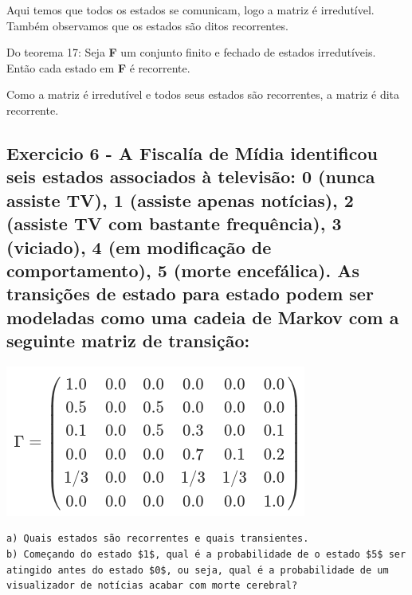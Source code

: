 \documentclass[
]{article}
\begin{document}
Aqui temos que todos os estados se comunicam, logo a matriz é
irredutível. Também observamos que os estados são ditos recorrentes.

Do teorema 17: Seja \textbf{F} um conjunto finito e fechado de estados
irredutíveis. Então cada estado em \textbf{F} é recorrente.

Como a matriz é irredutível e todos seus estados são recorrentes, a
matriz é dita recorrente.

\pagebreak

\hypertarget{exercicio-6---a-fiscaluxeda-de-muxeddia-identificou-seis-estados-associados-uxe0-televisuxe3o-0-nunca-assiste-tv-1-assiste-apenas-notuxedcias-2-assiste-tv-com-bastante-frequuxeancia-3-viciado-4-em-modificauxe7uxe3o-de-comportamento-5-morte-encefuxe1lica.-as-transiuxe7uxf5es-de-estado-para-estado-podem-ser-modeladas-como-uma-cadeia-de-markov-com-a-seguinte-matriz-de-transiuxe7uxe3o}{%
\subsection{Exercicio 6 - A Fiscalía de Mídia identificou seis estados
associados à televisão: 0 (nunca assiste TV), 1 (assiste apenas
notícias), 2 (assiste TV com bastante frequência), 3 (viciado), 4 (em
modificação de comportamento), 5 (morte encefálica). As transições de
estado para estado podem ser modeladas como uma cadeia de Markov com a
seguinte matriz de
transição:}\label{exercicio-6---a-fiscaluxeda-de-muxeddia-identificou-seis-estados-associados-uxe0-televisuxe3o-0-nunca-assiste-tv-1-assiste-apenas-notuxedcias-2-assiste-tv-com-bastante-frequuxeancia-3-viciado-4-em-modificauxe7uxe3o-de-comportamento-5-morte-encefuxe1lica.-as-transiuxe7uxf5es-de-estado-para-estado-podem-ser-modeladas-como-uma-cadeia-de-markov-com-a-seguinte-matriz-de-transiuxe7uxe3o}}

\includegraphics{Trabalho 03 - img6.png}

\begin{verbatim}
a) Quais estados são recorrentes e quais transientes.
b) Começando do estado $1$, qual é a probabilidade de o estado $5$ ser atingido antes do estado $0$, ou seja, qual é a probabilidade de um visualizador de notícias acabar com morte cerebral?
\end{verbatim}
\end{document}
